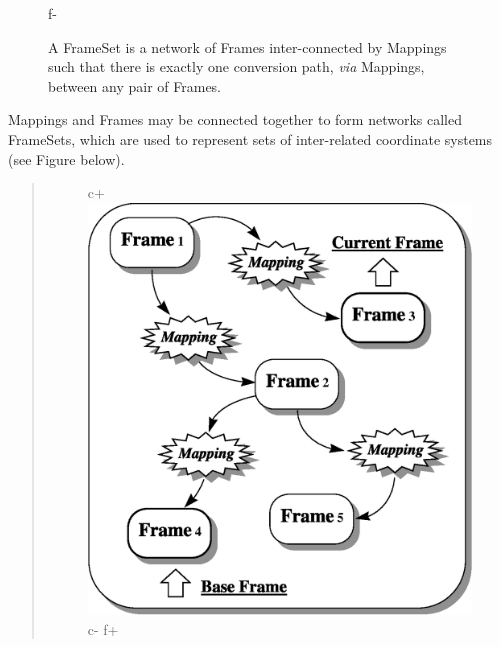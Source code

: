 \documentclass[twoside,11pt]{article}
\newenvironment{latexonly}{}{}
\begin{document}
\begin{latexonly}
\begin{figure}
\begin{center}
f-
   \caption{A FrameSet is a network of Frames inter-connected by Mappings
   such that there is exactly one conversion path, {\em{via}} Mappings,
   between any pair of Frames.}
   \label{fig:frameset}
   \end{center}
   \end{figure}
\end{latexonly}
\begin{htmlonly}
   Mappings and Frames may be connected together to form networks called
   FrameSets, which are used to represent sets of inter-related
   coordinate systems (see Figure below).
   \begin{quote}
   \begin{figure}
   \label{fig:frameset}
c+
   \includegraphics[scale=1.0]{sun211_figures/frameset.eps}
c-
f+

\end{figure}
\end{quote}
\end{htmlonly}
\end{document}
